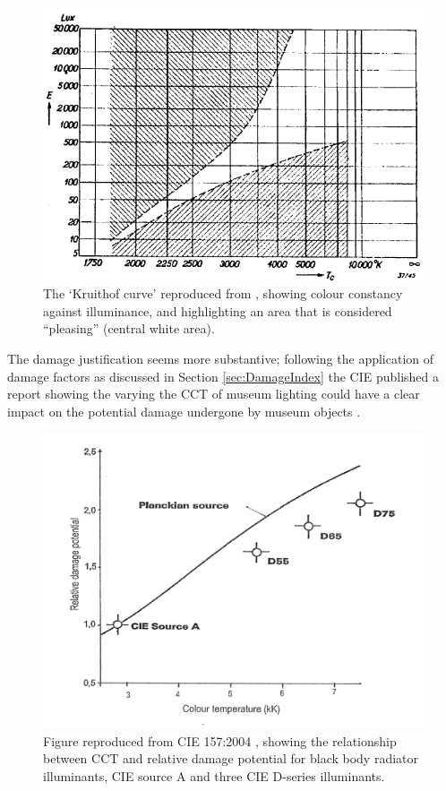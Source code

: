 
\begin{figure}[htbp]
\includegraphics[max width=\textwidth]{figs/LitRev/Kruithof.png}
\caption{The `Kruithof curve' reproduced from \citet{kruithof_tubular_1941}, showing colour constancy against illuminance, and highlighting an area that is considered ``pleasing'' (central white area).}
\label{fig:Kruithof}
\end{figure}

The damage justification seems more substantive; following the application of damage factors as discussed in Section \ref{sec:DamageIndex} the \gls{CIE} published a report showing the varying the \gls{CCT} of museum lighting could have a clear impact on the potential damage undergone by museum objects \citep{cie_cie_2004}. 

\begin{figure}[hbtp]
\includegraphics[max width=\textwidth]{figs/LitRev/CIE2004.png} 
\caption{Figure reproduced from \gls{CIE} 157:2004 \citep[p.16]{cie_cie_2004}, showing the relationship between \gls{CCT} and relative damage potential for black body radiator illuminants, \gls{CIE} source A and three \gls{CIE} D-series illuminants.}
\label{fig:CIE2004}
\end{figure}

